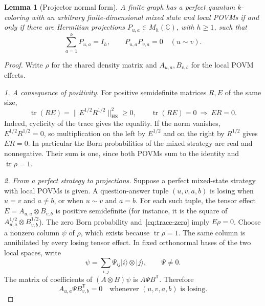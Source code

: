 \documentclass[11pt,a4paper]{article}
\numberwithin{equation}{section}
\numberwithin{figure}{section}
\numberwithin{table}{section}
\numberwithin{footnote}{section}
\newtheorem{lemma}[theorem]{Lemma}
\theoremstyle{informal}\newtheorem*{informaltheorem}{Informal theorem}
\theoremstyle{definition}\newtheorem{example}{Example}[section]
\theoremstyle{remark}\newtheorem{remark}[theorem]{Remark}
\newcommand{\C}{\mathbb C}
\newcommand{\tr}{\operatorname{tr}}
\newcommand{\HS}{\mathrm{HS}}
\begin{document}
\begin{lemma}[Projector normal form]\label{lem:normal}
A finite graph has a perfect quantum \(k\)-coloring with an arbitrary
finite-dimensional mixed state and local POVMs if and only if there
are Hermitian projections \(P_{u,a}\in M_h(\C)\), with \(h\geq1\),
such that
\begin{equation}\label{eq:projectors}
 \sum_{a=1}^kP_{u,a}=I_h,
 \qquad P_{u,a}P_{v,a}=0\quad(u\sim v).
\end{equation}
\end{lemma}
\begin{proof}
Write \(\rho\) for the shared density matrix and
\(A_{u,a},B_{v,b}\) for the local POVM effects.

\emph{1. A consequence of positivity.}
For positive
semidefinite matrices \(R,E\) of the same size,
\begin{equation}\label{eq:trace-zero}
 \tr(RE)=\|E^{1/2}R^{1/2}\|_{\HS}^2\geq0,
 \qquad \tr(RE)=0\ \Longrightarrow\ ER=0.
\end{equation}
Indeed, cyclicity of the trace gives the equality. If the norm
vanishes, \(E^{1/2}R^{1/2}=0\), so multiplication on the left by
\(E^{1/2}\) and on the right by \(R^{1/2}\) gives \(ER=0\).
In particular the Born probabilities of the mixed strategy are real
and nonnegative. Their sum is one, since both POVMs sum to the
identity and \(\tr\rho=1\).

\emph{2. From a perfect strategy to projections.}
Suppose a perfect mixed-state strategy with local POVMs is given.
A question-answer tuple \((u,v,a,b)\) is losing when
\(u=v\) and \(a\ne b\), or when \(u\sim v\) and \(a=b\).
For each such tuple, the tensor effect
\(E=A_{u,a}\otimes B_{v,b}\) is positive semidefinite
(for instance, it is the square of
\(A_{u,a}^{1/2}\otimes B_{v,b}^{1/2}\)).
The zero Born probability and~\eqref{eq:trace-zero} imply
\(E\rho=0\). Choose a nonzero column \(\psi\) of \(\rho\), which
exists because \(\tr\rho=1\). The same column is annihilated by
every losing tensor effect. In fixed orthonormal bases of the two
local spaces, write
\begin{equation}
 \psi=\sum_{i,j}\Psi_{ij}|i\rangle\otimes|j\rangle,
 \qquad \Psi\ne0.
\end{equation}
The matrix of coefficients of \((A\otimes B)\psi\) is
\(A\Psi B^{\mathsf T}\). Therefore
\begin{equation}\label{eq:zero-amplitudes}
 A_{u,a}\Psi B_{v,b}^{\mathsf T}=0
 \quad\text{whenever }(u,v,a,b)\text{ is losing}.
\end{equation}


\end{proof}
\end{document}
